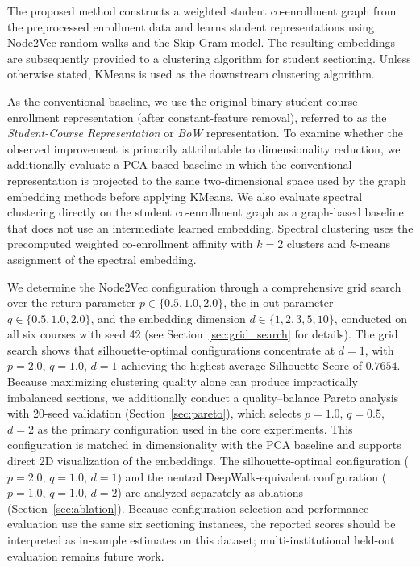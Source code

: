 \documentclass[pdflatex,sn-mathphys-num,iicol]{sn-jnl}%
\theoremstyle{thmstyleone}%
\theoremstyle{thmstyletwo}%
\theoremstyle{thmstylethree}%
\begin{document}
The proposed method constructs a weighted student co-enrollment graph from the preprocessed enrollment data and learns student representations using Node2Vec random walks and the Skip-Gram model. The resulting embeddings are subsequently provided to a clustering algorithm for student sectioning. Unless otherwise stated, KMeans is used as the downstream clustering algorithm.

As the conventional baseline, we use the original binary student-course enrollment representation (after constant-feature removal), referred to as the \textit{Student-Course Representation} or \textit{BoW} representation. To examine whether the observed improvement is primarily attributable to dimensionality reduction, we additionally evaluate a PCA-based baseline in which the conventional representation is projected to the same two-dimensional space used by the graph embedding methods before applying KMeans. We also evaluate spectral clustering directly on the student co-enrollment graph as a graph-based baseline that does not use an intermediate learned embedding. Spectral clustering uses the precomputed weighted co-enrollment affinity with $k{=}2$ clusters and $k$-means assignment of the spectral embedding.

We determine the Node2Vec configuration through a comprehensive grid search over the return parameter $p \in \{0.5, 1.0, 2.0\}$, the in-out parameter $q \in \{0.5, 1.0, 2.0\}$, and the embedding dimension $d \in \{1, 2, 3, 5, 10\}$, conducted on all six courses with seed 42 (see Section~\ref{sec:grid_search} for details). The grid search shows that silhouette-optimal configurations concentrate at $d=1$, with $p=2.0$, $q=1.0$, $d=1$ achieving the highest average Silhouette Score of $0.7654$. Because maximizing clustering quality alone can produce impractically imbalanced sections, we additionally conduct a quality--balance Pareto analysis with 20-seed validation (Section~\ref{sec:pareto}), which selects $p=1.0$, $q=0.5$, $d=2$ as the primary configuration used in the core experiments. This configuration is matched in dimensionality with the PCA baseline and supports direct 2D visualization of the embeddings. The silhouette-optimal configuration ($p=2.0$, $q=1.0$, $d=1$) and the neutral DeepWalk-equivalent configuration ($p=1.0$, $q=1.0$, $d=2$) are analyzed separately as ablations (Section~\ref{sec:ablation}). Because configuration selection and performance evaluation use the same six sectioning instances, the reported scores should be interpreted as in-sample estimates on this dataset; multi-institutional held-out evaluation remains future work.
\end{document}
